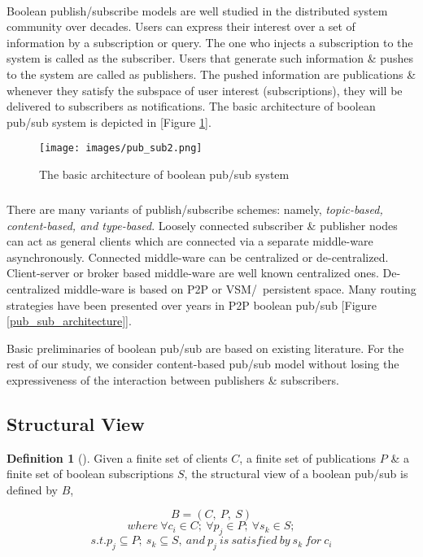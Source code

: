 \documentclass[a4paper,12pt,oneside]{book}
\theoremstyle{definition}
\newtheorem{definition}{Definition}[section]
\theoremstyle{remark}
\begin{document}
\paragraph*{}
Boolean publish/subscribe models are well studied in the distributed system community over decades. Users can express their interest over a set of information by a subscription or query. The one who injects a subscription to the system is called as the subscriber. Users that generate such information \& pushes to the system are called as publishers. The pushed information are publications \& whenever they satisfy the subspace of user interest (subscriptions), they will be delivered to subscribers as notifications. The basic architecture of boolean pub/sub system is depicted in [Figure \ref{pub_sub2}].

\begin{figure}[h]
\begin{center}
\texttt{[image: images/pub\_sub2.png]}
\caption{The basic architecture of boolean pub/sub system}
\label{pub_sub2}
\end{center}
\end{figure}

\subparagraph*{}
There are many variants of publish/subscribe schemes: namely, \emph{topic-based, content-based, and type-based}. Loosely connected subscriber \& publisher nodes can act as general clients which are connected via a separate middle-ware asynchronously. Connected middle-ware can be centralized or de-centralized. Client-server or broker based middle-ware are well known centralized ones. De-centralized middle-ware is based on \ac{P2P} or \ac{VSM}/\ persistent space. Many routing strategies have been presented over years in \ac{P2P} boolean pub/sub [Figure \ref{pub_sub_architecture}].

Basic preliminaries of boolean pub/sub are based on existing literature. For the rest of our study, we consider content-based pub/sub model without losing the expressiveness of the interaction between publishers \& subscribers.

\subsection{Structural View}
\begin{definition}[\label{def_bpsview}]
Given a finite set of clients $C$, a finite set of publications $P$ \& a finite set of boolean subscriptions $S$, the structural view of a boolean pub/sub is defined by $B$,
\begin{center}
\[ B=(C,\ P,\ S) \]
\[ where\ \forall c_i \in C;\ \forall p_j \in P;\ \forall s_k \in S; \]
\[ s.t. p_j \subseteq P;\ s_k \subseteq S,\ and\ p_j \ is\ satisfied\ by\ s_k \ for\ c_i \]
\end{center}
\end{definition}
\end{document}
